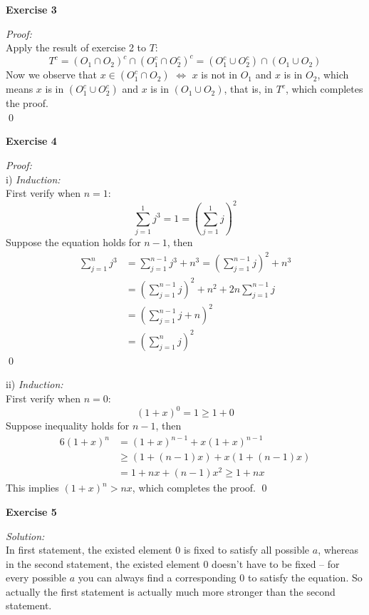 \documentclass[12pt]{article}
\begin{document}
\textbf{Exercise 3}\par
\textit{Proof:}\\

Apply the result of exercise 2 to $T$:
\[
T^c=(O_1\cap O_2)^c\cap (O_1^c\cap O_2^c)^c=
(O_1^c\cup O_2^c)\cap(O_1\cup O_2)
\]
Now we observe that $x\in(O_1^c\cap O_2)$  $\iff$ $x$ is not in $O_1$ and $x$ is in $O_2$, which means $x$ is in $(O_1^c\cup O_2^c)$ and $x$ is in $(O_1\cup O_2)$, that is, in $T^c$, which completes the proof.\\
\qed
\par

\textbf{Exercise 4}\par
\textit{Proof:}\\
 i) \textit{Induction:}\\First verify when $n=1$:
\[
\sum_{j=1}^{1}j^3=1=\left(\sum_{j=1}^{1}j\right)^2
\]
Suppose the equation holds for $n-1$, then
\begin{align*}
\sum_{j=1}^{n}j^3&=\sum_{j=1}^{n-1}j^3+n^3
=\left(\sum_{j=1}^{n-1}j \right)^2+n^3\\
&=\left(\sum_{j=1}^{n-1}j\right)^2 +n^2+2n\sum_{j=1}^{n-1}j\\
&=\left(\sum_{j=1}^{n-1}j+n\right)^2\\
&=\left(\sum_{j=1}^{n}j\right)^2
\end{align*}
\qed
\par
ii) \textit{Induction:}\\First verify when $n=0$:
\[
(1+x)^0=1\ge1+0
\]
Suppose inequality holds for $n-1$, then
\begin{alignat*}{6}
(1+x)^n&=(1+x)^{n-1}+x(1+x)^{n-1}\\
            &\ge (1+(n-1)x)+x(1+(n-1)x)\\
            &= 1+nx+(n-1)x^2\ge1+nx
\end{alignat*}
This implies $(1+x)^n>nx$, which completes the proof.
\qed
\par
\textbf{Exercise 5}\par
\textit{Solution:}\\
In first statement, the existed element 0 is fixed to satisfy all possible $a$, whereas in the second statement, the existed element 0 doesn't have to be fixed -- for every possible $a$ you can always find a corresponding 0 to satisfy the equation. So actually the first statement is actually much more stronger than the second statement.
\end{document}
